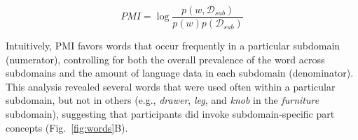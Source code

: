 \documentclass[10pt,letterpaper]{article}
\begin{document}
\begin{equation} \label{eq:pmi}
PMI = \log \dfrac{p(w, \mathcal{D}_{sub})}{p(w)p(\mathcal{D}_{sub})}
\end{equation}

Intuitively, PMI favors words that occur frequently in a particular subdomain (numerator), controlling for both the overall prevalence of the word across subdomains and the amount of language data in each subdomain (denominator).
This analysis revealed several words that were used often within a particular subdomain, but not in others (e.g., \textit{drawer}, \textit{leg}, and \textit{knob} in the \textit{furniture} subdomain), suggesting that participants did invoke subdomain-specific part concepts (Fig.~\ref{fig:words}B).


\end{document}
